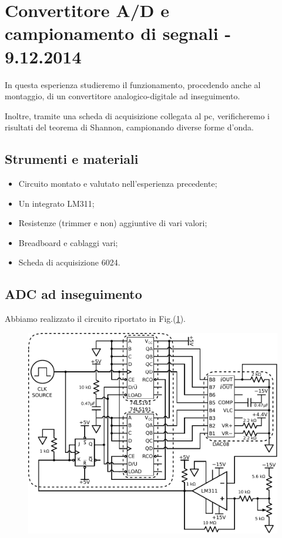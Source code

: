 \section{Convertitore A/D e campionamento di segnali - 9.12.2014}

In questa esperienza studieremo il funzionamento, procedendo anche al montaggio, di un convertitore analogico-digitale ad inseguimento.

Inoltre, tramite una scheda di acquisizione collegata al pc, verificheremo i risultati del teorema di Shannon, campionando diverse forme d'onda.

\subsection*{Strumenti e materiali}

\begin{itemize} [noitemsep]
	\item Circuito montato e valutato nell'esperienza precedente;
\item Un integrato LM311;
\item Resistenze (trimmer e non) aggiuntive di vari valori;
\item Breadboard e cablaggi vari;
\item Scheda di acquisizione 6024.
\end{itemize}

\subsection{ADC ad inseguimento}
Abbiamo realizzato il circuito riportato in Fig.(\ref{cir13:ADC}).

\begin{figure}[htpc]
\centering
	\includegraphics[width=.73\textwidth]{../E13/latex/ADC.pdf}
	\caption{}
	\label{cir13:ADC}
\end{figure}

